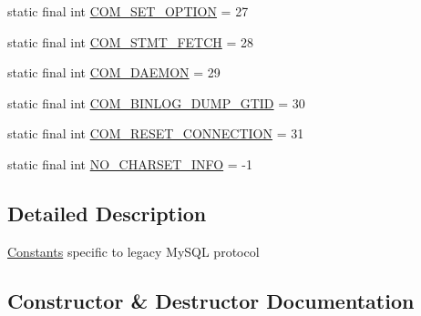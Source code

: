 \begin{DoxyCompactItemize}
\item 
static final int \mbox{\hyperlink{classcom_1_1mysql_1_1cj_1_1protocol_1_1a_1_1_native_constants_a172bb9311978d2ae1161f219f9d4847a}{C\+O\+M\+\_\+\+S\+E\+T\+\_\+\+O\+P\+T\+I\+ON}} = 27
\item 
static final int \mbox{\hyperlink{classcom_1_1mysql_1_1cj_1_1protocol_1_1a_1_1_native_constants_ab70d3849e93a932affbb5e042a207d6c}{C\+O\+M\+\_\+\+S\+T\+M\+T\+\_\+\+F\+E\+T\+CH}} = 28
\item 
static final int \mbox{\hyperlink{classcom_1_1mysql_1_1cj_1_1protocol_1_1a_1_1_native_constants_ab6e455043896725abd66e4d2f979274e}{C\+O\+M\+\_\+\+D\+A\+E\+M\+ON}} = 29
\item 
static final int \mbox{\hyperlink{classcom_1_1mysql_1_1cj_1_1protocol_1_1a_1_1_native_constants_ad2333f754ac12d8c7c51cbf4eddf0901}{C\+O\+M\+\_\+\+B\+I\+N\+L\+O\+G\+\_\+\+D\+U\+M\+P\+\_\+\+G\+T\+ID}} = 30
\item 
static final int \mbox{\hyperlink{classcom_1_1mysql_1_1cj_1_1protocol_1_1a_1_1_native_constants_ae07d7658c50e62db715cc6d3281aecbf}{C\+O\+M\+\_\+\+R\+E\+S\+E\+T\+\_\+\+C\+O\+N\+N\+E\+C\+T\+I\+ON}} = 31
\item 
static final int \mbox{\hyperlink{classcom_1_1mysql_1_1cj_1_1protocol_1_1a_1_1_native_constants_a0f6cae1c28c039be213a26bf86340106}{N\+O\+\_\+\+C\+H\+A\+R\+S\+E\+T\+\_\+\+I\+N\+FO}} = -\/1
\end{DoxyCompactItemize}


\subsection{Detailed Description}
\mbox{\hyperlink{classcom_1_1mysql_1_1cj_1_1_constants}{Constants}} specific to legacy My\+S\+QL protocol 

\subsection{Constructor \& Destructor Documentation}
\mbox{\label{classcom_1_1mysql_1_1cj_1_1protocol_1_1a_1_1_native_constants_a39c2f82cb492ad58cbdfb80b3d82d85d}} 
